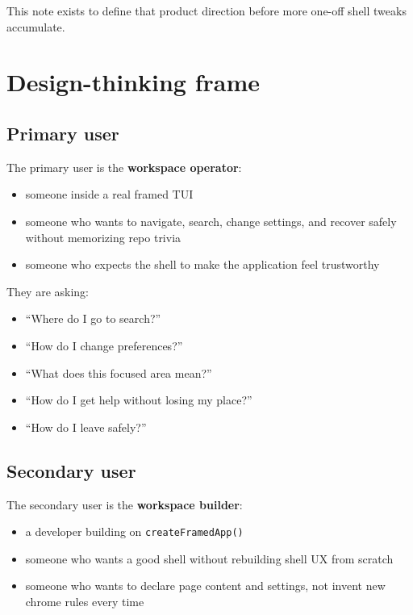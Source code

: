 This note exists to define that product direction before more one-off shell tweaks accumulate.

\section{Design-thinking frame}\label{record-047-design-thinking-frame}

\subsection{Primary user}\label{record-047-primary-user}

The primary user is the \textbf{workspace operator}:

\begin{itemize}
\tightlist
\item
  someone inside a real framed TUI
\item
  someone who wants to navigate, search, change settings, and recover safely without memorizing repo trivia
\item
  someone who expects the shell to make the application feel trustworthy
\end{itemize}

They are asking:

\begin{itemize}
\tightlist
\item
  ``Where do I go to search?''
\item
  ``How do I change preferences?''
\item
  ``What does this focused area mean?''
\item
  ``How do I get help without losing my place?''
\item
  ``How do I leave safely?''
\end{itemize}

\subsection{Secondary user}\label{record-047-secondary-user}

The secondary user is the \textbf{workspace builder}:

\begin{itemize}
\tightlist
\item
  a developer building on \texttt{c\allowbreak{}r\allowbreak{}e\allowbreak{}a\allowbreak{}t\allowbreak{}e\allowbreak{}F\allowbreak{}r\allowbreak{}a\allowbreak{}m\allowbreak{}e\allowbreak{}d\allowbreak{}A\allowbreak{}p\allowbreak{}p\allowbreak{}(\allowbreak{})}
\item
  someone who wants a good shell without rebuilding shell UX from scratch
\item
  someone who wants to declare page content and settings, not invent new chrome rules every time
\end{itemize}

